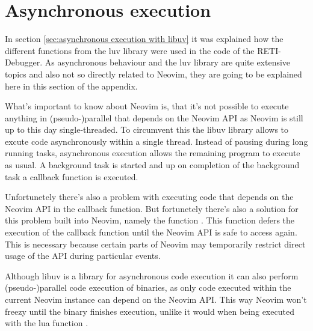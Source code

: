 \documentclass{report}
\begin{document}
\section{Asynchronous execution}
\label{sec:asynchronous execution}

In section \ref{sec:asynchronous execution with libuv} it was explained how the different functions from the \alert{luv} library were used in the code of the RETI-Debugger. As asynchronous behaviour and the \alert{luv} library are quite extensive topics and also not so directly related to Neovim, they are going to be explained here in this section of the appendix.

What's important to know about Neovim is, that it's not possible to execute anything in (pseudo-)parallel that depends on the \alert{Neovim API} as Neovim is still up to this day \alert{single-threaded}. To circumvent this the libuv library allows to excute code \alert{asynchronously} within a single thread. Instead of pausing during long running tasks, asynchronous execution allows the remaining program to execute as usual. A background task is started and up on completion of the background task a \alert{callback function} is executed.

Unfortunetely there's also a problem with executing code that depends on the Neovim API in the callback function. But fortunetely there's also a solution for this problem built into Neovim, namely the function . This function defers the execution of the callback function until the Neovim API is safe to access again. This is necessary because certain parts of Neovim may temporarily restrict direct usage of the API during particular events.

Although libuv is a library for asynchronous code execution it can also perform \alert{(pseudo-)parallel} code execution of binaries, as only code executed within the current Neovim instance can depend on the Neovim API. This way Neovim won't freezy until the binary finishes execution, unlike it would when being executed with the lua function .
\end{document}
